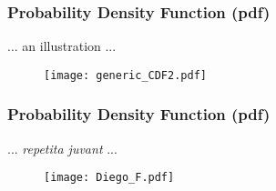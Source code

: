 \documentclass[notes=show,smaller,handout]{beamer}\usepackage[]{graphicx}\usepackage[]{color}
\newenvironment{stepitemize}{\begin{itemize}[<+->]}{\end{itemize} }
\begin{document}
\begin{frame}%

\frametitle{Probability Density Function (pdf)}

 ... an illustration ...

\begin{figure}[ptb]\centering
\texttt{[image: generic\_CDF2.pdf]}%
\end{figure}%

%

\end{frame}%


\begin{frame}%

\frametitle{Probability Density Function (pdf)}

 ... \textit{repetita juvant} ...

\begin{figure}[ptb]\centering
\texttt{[image: Diego\_F.pdf]}%
\end{figure}%

\end{frame}
\end{document}
